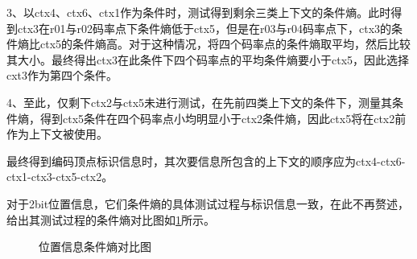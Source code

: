 \documentclass[bachelor,print,msfonts]{xduthesis}
\begin{document}
3、以ctx4、ctx6、ctx1作为条件时，测试得到剩余三类上下文的条件熵。此时得到ctx3在r01与r02码率点下条件熵低于ctx5，但是在r03与r04码率点下，ctx3的条件熵比ctx5的条件熵高。对于这种情况，将四个码率点的条件熵取平均，然后比较其大小。最终得出ctx3在此条件下四个码率点的平均条件熵要小于ctx5，因此选择cxt3作为第四个条件。

4、至此，仅剩下ctx2与ctx5未进行测试，在先前四类上下文的条件下，测量其条件熵，得到ctx5条件在四个码率点小均明显小于ctx2条件熵，因此ctx5将在ctx2前作为上下文被使用。

最终得到编码顶点标识信息时，其次要信息所包含的上下文的顺序应为ctx4-ctx6-ctx1-ctx3-ctx5-ctx2。

对于2bit位置信息，它们条件熵的具体测试过程与标识信息一致，在此不再赘述，给出其测试过程的条件熵对比图如\ref{位置信息条件熵对比图}所示。

\begin{figure}[h]
    \centering

    \caption{位置信息条件熵对比图}
    \label{位置信息条件熵对比图}
\end{figure}
\end{document}
